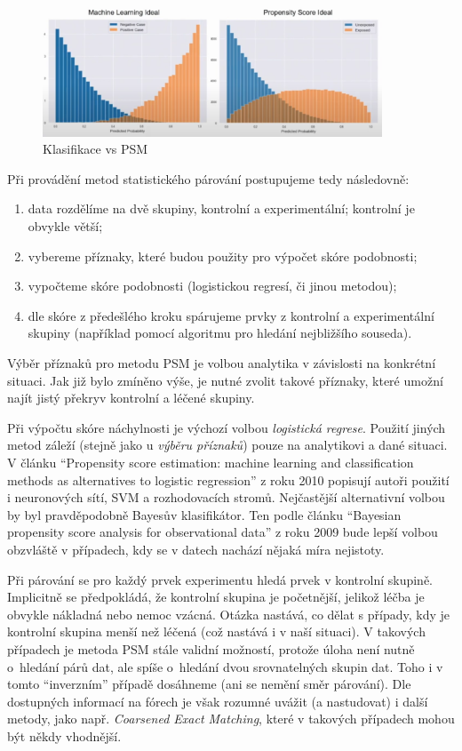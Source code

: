 \begin{figure}[htbp]
	\centering
	\includegraphics[width=0.9\textwidth]{graphs/psm-vs-class.png}
	\caption{Klasifikace vs PSM}
\end{figure}
\FloatBarrier

Při provádění metod statistického párování postupujeme tedy následovně:

\begin{enumerate}
    \item data rozdělíme na dvě skupiny, kontrolní a experimentální; kontrolní je obvykle větší;
    \item vybereme příznaky, které budou použity pro výpočet skóre podobnosti;
    \item vypočteme skóre podobnosti (logistickou regresí, či jinou metodou);
    \item dle skóre z předešlého kroku spárujeme prvky z kontrolní a experimentální skupiny (například pomocí algoritmu pro hledání nejbližšího souseda).
\end{enumerate}

Výběr příznaků pro metodu PSM je volbou analytika v závislosti na konkrétní situaci.
Jak již bylo zmíněno výše, je nutné zvolit takové příznaky, které umožní najít jistý překryv kontrolní a léčené skupiny.

Při výpočtu skóre náchylnosti je výchozí volbou \textit{logistická regrese}.
Použití jiných metod záleží (stejně jako u \textit{výběru příznaků}) pouze na analytikovi a dané situaci.
V článku \enquote{Propensity score estimation: machine learning and classification methods as alternatives to logistic regression} z roku 2010 popisují autoři použití i neuronových sítí, SVM a rozhodovacích stromů.
Nejčastější alternativní volbou by byl pravděpodobně Bayesův klasifikátor.
Ten podle článku \enquote{Bayesian propensity score analysis for observational data} z roku 2009 bude lepší volbou obzvláště v případech, kdy se v datech nachází nějaká míra nejistoty.

Při párování se pro každý prvek experimentu hledá prvek v kontrolní skupině.
Implicitně se předpokládá, že kontrolní skupina je početnější, jelikož léčba je obvykle nákladná nebo nemoc vzácná.
Otázka nastává, co dělat s případy, kdy je kontrolní skupina menší než léčená (což nastává i v naší situaci).
V takových případech je metoda PSM stále validní možností, protože úloha není nutně o~hledání párů dat, ale spíše o~hledání dvou srovnatelných skupin dat.
Toho i v tomto \enquote{inverzním} případě dosáhneme (ani se nemění směr párování).
Dle dostupných informací na fórech je však rozumné uvážit (a nastudovat) i další metody, jako např. \textit{Coarsened Exact Matching}, které v takových případech mohou být někdy vhodnější.

